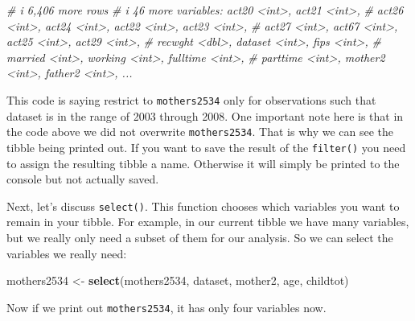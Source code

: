 \documentclass[
]{book}
\newenvironment{Shaded}{\begin{snugshade}}{\end{snugshade}}
\newcommand{\CommentTok}[1]{\textcolor[rgb]{0.56,0.35,0.01}{\textit{#1}}}
\newcommand{\FunctionTok}[1]{\textcolor[rgb]{0.13,0.29,0.53}{\textbf{#1}}}
\newcommand{\NormalTok}[1]{#1}
\newcommand{\OtherTok}[1]{\textcolor[rgb]{0.56,0.35,0.01}{#1}}
\begin{document}
\begin{Shaded}
\begin{Highlighting}[]
\CommentTok{\# i 6,406 more rows}
\CommentTok{\# i 46 more variables: act20 \textless{}int\textgreater{}, act21 \textless{}int\textgreater{},}
\CommentTok{\#   act26 \textless{}int\textgreater{}, act24 \textless{}int\textgreater{}, act22 \textless{}int\textgreater{}, act23 \textless{}int\textgreater{},}
\CommentTok{\#   act27 \textless{}int\textgreater{}, act67 \textless{}int\textgreater{}, act25 \textless{}int\textgreater{}, act29 \textless{}int\textgreater{},}
\CommentTok{\#   recwght \textless{}dbl\textgreater{}, dataset \textless{}int\textgreater{}, fips \textless{}int\textgreater{},}
\CommentTok{\#   married \textless{}int\textgreater{}, working \textless{}int\textgreater{}, fulltime \textless{}int\textgreater{},}
\CommentTok{\#   parttime \textless{}int\textgreater{}, mother2 \textless{}int\textgreater{}, father2 \textless{}int\textgreater{}, ...}
\end{Highlighting}
\end{Shaded}

This code is saying restrict to \texttt{mothers2534} only for observations such that dataset is in the range of 2003 through 2008. One important note here is that in the code above we did not overwrite \texttt{mothers2534}. That is why we can see the tibble being printed out. If you want to save the result of the \texttt{filter()} you need to assign the resulting tibble a name. Otherwise it will simply be printed to the console but not actually saved.

Next, let's discuss \texttt{select()}. This function chooses which variables you want to remain in your tibble. For example, in our current tibble we have many variables, but we really only need a subset of them for our analysis. So we can select the variables we really need:

\begin{Shaded}
\begin{Highlighting}[]
\NormalTok{mothers2534 }\OtherTok{\textless{}{-}} \FunctionTok{select}\NormalTok{(mothers2534, dataset, mother2, age, childtot)}
\end{Highlighting}
\end{Shaded}

Now if we print out \texttt{mothers2534}, it has only four variables now.
\end{document}
